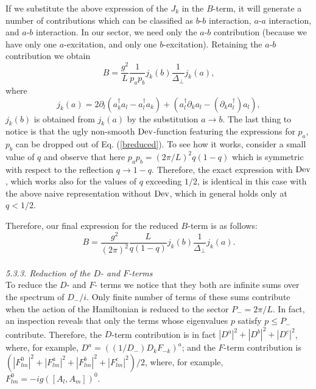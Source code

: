 \documentclass[a4paper,12pt]{article}
\begin{document}
If we substitute the above expression of the $J_k$ in the $B$-term, 
it will generate a number of contributions which can be classified 
as $b$-$b$ interaction, $a$-$a$ interaction, and $a$-$b$ interaction. 
In our sector, we need only the $a$-$b$ 
contribution (because we have only one $a$-excitation, and only 
one $b$-excitation). Retaining the $a$-$b$ contribution we obtain
\begin{equation}
\label{breduced}
B = \frac{g^2}{L}\frac{1}{p_a p_b} j_k(b)\frac{1}{\Delta_\perp}j_k(a),
\end{equation} 
where 
\begin{equation}
\label{jreduced}
j_k(a) = 2\partial_l(a^\dagger_ka_l-a^\dagger_la_k) + 
(a^\dagger_l\partial_ka_l - (\partial_ka^\dagger_l)a_l),
\end{equation}
$j_k(b)$ is obtained  from $j_k(a)$ by the substitution $a\rightarrow b$.
The last thing to notice is that the ugly non-smooth 
${\rm Dev}$-function featuring the expressions for $p_a$, $p_b$ 
can be dropped out of Eq. (\ref{breduced}). To see how it works, 
consider a small value of $q$ and observe that here 
$p_ap_b = (2\pi/L)^2q(1-q)$ which is symmetric with respect 
to the reflection $q\rightarrow 1-q$. Therefore, 
the exact expression with ${\rm Dev}$, which works also for 
the values of $q$ exceeding $1/2$, is identical in this case 
with the above naive representation 
without  ${\rm Dev}$, which in general holds only at $q<1/2$.

Therefore, our final expression for the reduced $B$-term is as follows:
\begin{equation}
\label{finalbreduced}
B=\frac{g^2}{(2\pi)^2}\frac{L}{q(1-q)}j_k(b)\frac{1}{\Delta_\perp}j_k(a).
\end{equation}
\\


{\it 5.3.3. Reduction of the $D$- and $F$-terms }\\

To reduce the $D$- and $F$- terms we notice that they both are 
infinite sums over the spectrum of $D_-/i$. Only finite number 
of terms of these sums contribute 
when the action of the Hamiltonian is reduced to the sector 
$P_- = 2\pi/L$. In fact, 
an inspection reveals that only the terms whose eigenvalues $p$ satisfy 
$p\leq P_-$ contribute. Therefore, the $D$-term contribution is in fact
$|D^a|^2+|D^b|^2+|D^c|^2$, where, for example, $D^a = ((1/D_-)D_kF_{-k})^a$; 
and the $F$-term contribution is 
$(|F_{lm}^0|^2+|F_{lm}^a|^2+|F_{lm}^b|^2+|F_{lm}^c|^2)/2$, where, for 
example, $F_{lm}^0 = -ig([A_l,A_m])^0$.
\end{document}

